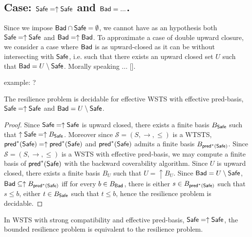 

\subsection{Case: $\textsf{Safe}=\uparrow \textsf{Safe}$ and $\textsf{Bad} = ... $.}


Since we impose $\textsf{Bad} \cap \textsf{Safe} = \emptyset$, we cannot have as an hypothesis
both $\textsf{Safe} = \uparrow \textsf{Safe}$ and $\textsf{Bad} = \uparrow \textsf{Bad}$. To approximate a case
of double upward closure, we consider a case where $\textsf{Bad}$ is as upward-closed
as it can be without intersecting with $\textsf{Safe}$,
i.e. 
such that there exists an upward closed set $U$
such that $\textsf{Bad} = U \setminus \textsf{Safe}$.
Morally speaking ... [].



example: ?


\begin{theorem}\label{up-up}
The resilience problem is decidable for effective WSTS with effective pred-basis, $\textsf{Safe}=\uparrow \textsf{Safe}$
and $\textsf{Bad}= U \setminus \textsf{Safe}$.

\end{theorem}


\begin{proof}
Since $\textsf{Safe}=\uparrow \textsf{Safe}$ is upward closed, there exists a finite basis $B_{ \textsf{Safe}}$ such that $\uparrow \textsf{Safe} = \uparrow B_{\textsf{Safe}}$. 
Moreover since $\mathscr{S}=(S,\rightarrow,\leq)$ is a WTSTS,  $\textsf{pred}^*(\textsf{Safe})=\uparrow \textsf{pred}^*(\textsf{Safe})$ and $\textsf{pred}^*(\textsf{Safe})$ admits a finite basis $B_{\textsf{pred}^*(\textsf{Safe})}$. Since $\mathscr{S}=(S,\rightarrow,\leq)$ is a WSTS  with effective pred-basis, we may compute a finite basis of $\textsf{pred}^*(\textsf{Safe})$ with the backward coverability algorithm. 
Since $U$  is upward closed, there exists a finite basis $B_{U}$ such that $U = \uparrow B_{U}$. %
Since $\textsf{Bad} = U \setminus \textsf{Safe}$, $\textsf{Bad} \subseteq \uparrow B_{\textsf{pred}^*(\textsf{Safe})}$ iff for every $b \in B_{\textsf{Bad}}$, there is either $s \in B_{\textsf{pred}^*(\textsf{Safe})}$ such that $s \leq b$, either $t \in B_{\textsf{Safe}}$ such that $t\leq b$,
hence the resilience problem is decidable.
\end{proof}

\begin{proposition}
In WSTS with strong compatibility and effective pred-basis,  $\textsf{Safe}=\uparrow \textsf{Safe}$, the bounded resilience problem is equivalent to the resilience problem.
\end{proposition}

